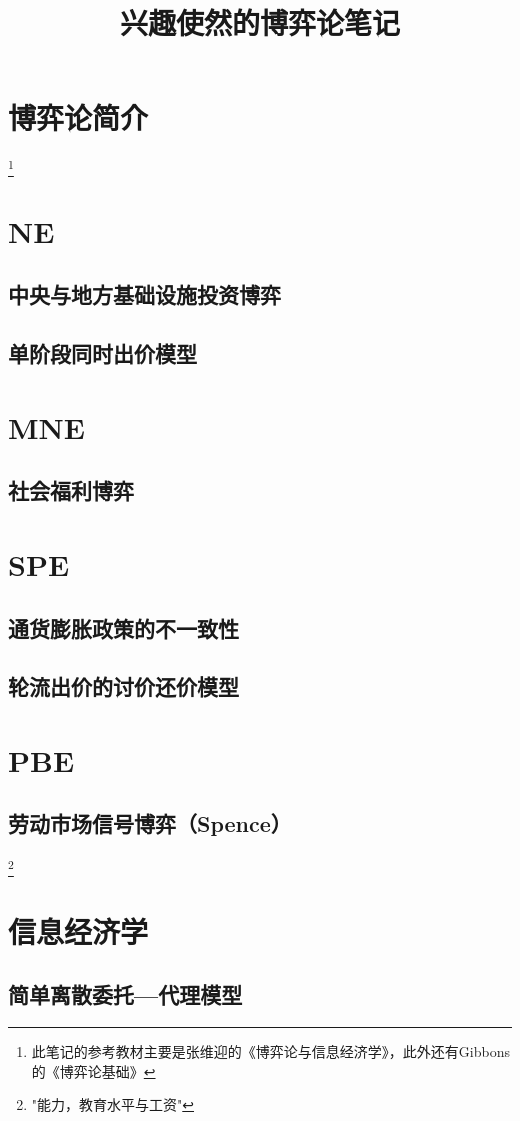 \documentclass{article}
\begin{document}
\title{兴趣使然的博弈论笔记}
\maketitle
\tableofcontents
\section{博弈论简介} \footnote{此笔记的参考教材主要是张维迎的《博弈论与信息经济学》，此外还有Gibbons的《博弈论基础》}
\section{NE}
\subsection{中央与地方基础设施投资博弈}
\subsection{单阶段同时出价模型}
\section{MNE}
\subsection{社会福利博弈}
\section{SPE}
\subsection{通货膨胀政策的不一致性}
\subsection{轮流出价的讨价还价模型}
\section{PBE}
\subsection{劳动市场信号博弈（Spence）}\footnote{"能力，教育水平与工资"}
\section{信息经济学}
\subsection{简单离散委托—代理模型}
\end{document}
